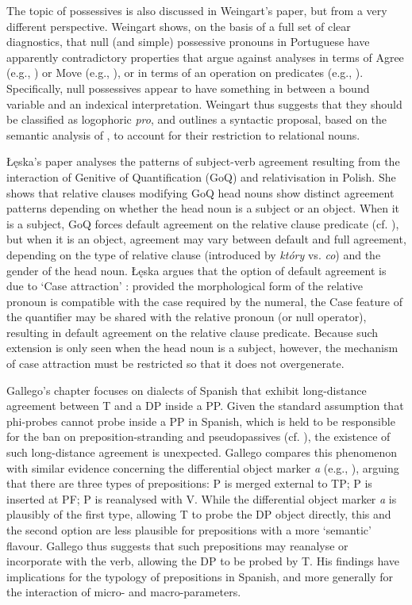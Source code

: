 \documentclass[output=paper]{langsci/langscibook}
\begin{document}
The topic of possessives is also discussed in Weingart’s paper, but from a very different perspective. Weingart shows, on the basis of a full set of clear diagnostics, that null (and simple) possessive pronouns in Portuguese have apparently contradictory properties that argue against analyses in terms of Agree (e.g., \citealt{Hicks2009}) or Move (e.g., \citealt{Floripi2009,Rodrigues2010}), or in terms of an operation on predicates (e.g., \citealt{Reinhart2006}). Specifically, null possessives appear to have something in between a bound variable and an indexical interpretation. Weingart thus suggests that they should be classified as logophoric \textit{pro}, and outlines a syntactic proposal, based on the semantic analysis of \citet{Partee1997}, to account for their restriction to relational nouns.

Łęska’s paper analyses the patterns of subject-verb agreement resulting from the interaction of Genitive of Quantification (GoQ) and relativisation in Polish. She shows that relative clauses modifying GoQ head nouns show distinct agreement patterns depending on whether the head noun is a subject or an object. When it is a subject, GoQ forces default agreement on the relative clause predicate (cf. \citealt{Leska2016}), but when it is an object, agreement may vary between default and full agreement, depending on the type of relative clause (introduced by \textit{który} vs. \textit{co}) and the gender of the head noun. Łęska argues that the option of default agreement is due to ‘Case attraction’ \citep{Bader2006}: provided the morphological form of the relative pronoun is compatible with the case required by the numeral, the Case feature of the quantifier may be shared with the relative pronoun (or null operator), resulting in default agreement on the relative clause predicate. Because such extension is only seen when the head noun is a subject, however, the mechanism of case attraction must be restricted so that it does not overgenerate.

Gallego’s chapter focuses on dialects of Spanish that exhibit long-distance agreement between T and a DP inside a PP. Given the standard assumption that phi-probes cannot probe inside a PP in Spanish, which is held to be responsible for the ban on preposition-stranding and pseudopassives (cf. \citealt{Law2006}), the existence of such long-distance agreement is unexpected. Gallego compares this phenomenon with similar evidence concerning the differential object marker \textit{a} (e.g., \citealt{Torrego1998,López2012}), arguing that there are three types of prepositions: P is merged external to TP; P is inserted at PF; P is reanalysed with V. While the differential object marker \textit{a} is plausibly of the first type, allowing T to probe the DP object directly, this and the second option are less plausible for prepositions with a more ‘semantic’ flavour. Gallego thus suggests that such prepositions may reanalyse or incorporate with the verb, allowing the DP to be probed by T. His findings have implications for the typology of prepositions in Spanish, and more generally for the interaction of micro- and macro-parameters.
\end{document}
